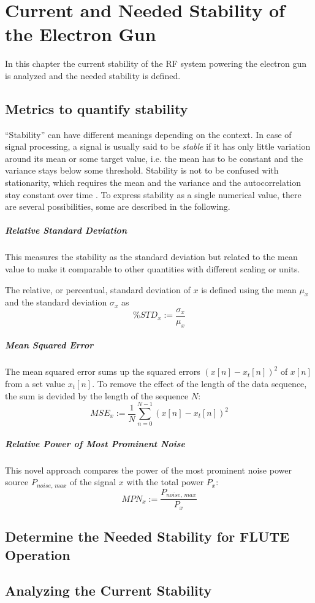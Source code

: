 \chapter{Current and Needed Stability of the Electron Gun}
In this chapter the current stability of the RF system powering the electron gun is analyzed and the needed stability is defined.

\section{Metrics to quantify stability}\label{sec:metrics}
``Stability'' can have different meanings depending on the context. In case of signal processing, a signal is usually said to be \textit{stable} if it has only little variation around its mean or some target value, i.e. the mean has to be constant and the variance stays below some threshold. 
Stability is not to be confused with stationarity, which requires the mean and the variance and the autocorrelation stay constant over time \cite{Guthrie2020}. To express stability as a single numerical value, there are several possibilities, some are described in the following.

\paragraph{Relative Standard Deviation}
This measures the stability as the standard deviation but related to the mean value to make it comparable to other quantities with different scaling or units.

The relative, or percentual, standard deviation of $x$ is defined using the mean $\mu_x$ and the standard deviation $\sigma_x$ as
\begin{equation}
\%STD_x := \frac{\sigma_x}{\mu_x}
\end{equation}

\paragraph{Mean Squared Error}
The mean squared error sums up the squared errors $\left(x[n] - x_t[n]\right)^2$ of $x[n]$ from a set value $x_t[n]$. To remove the effect of the length of the data sequence, the sum is devided by the length of the sequence $N$:
\begin{equation}
MSE_x := \frac{1}{N} \sum_{n=0}^{N-1} \left(x[n] - x_t[n]\right)^2
\end{equation}

\paragraph{Relative Power of Most Prominent Noise}
This novel approach compares the power of the most prominent noise power source $P_{noise,\,max}$ of the signal $x$ with the total power $P_x$:
\begin{equation}
MPN_x := \frac{P_{noise,\,max}}{P_x}
\end{equation}

\section{Determine the Needed Stability for FLUTE Operation}


\section{Analyzing the Current Stability}


